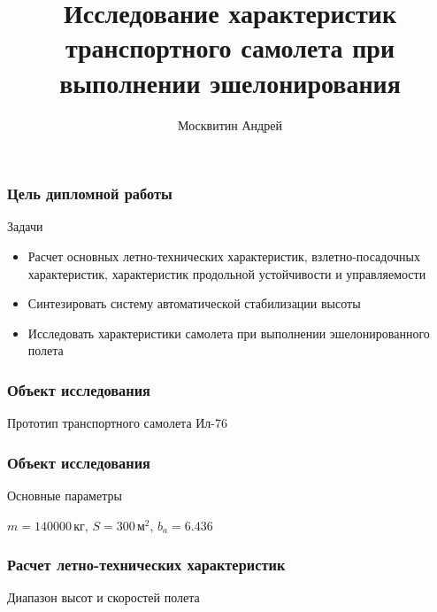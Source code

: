 \documentclass{beamer}
\title{Исследование характеристик транспортного самолета при выполнении эшелонирования}
\author{Москвитин Андрей}
\institute{М1О-403Б-18}
\date{}
\begin{document}
\maketitle

\begin{frame}
\frametitle{Цель дипломной работы}
\begin{block}{Задачи}
    \begin{itemize}
        \item Расчет основных летно-технических характеристик, взлетно-посадочных
            характеристик, характеристик продольной устойчивости и управляемости 
        \item Синтезировать систему автоматической стабилизации высоты 
        \item Исследовать характеристики самолета при выполнении эшелонированного полета 
    \end{itemize}
\end{block}
\end{frame}

\begin{frame}
\frametitle{Объект исследования}
Прототип транспортного самолета Ил-76
\begin{figure}
\end{figure}
\end{frame}

\begin{frame}
    \frametitle{Объект исследования}
    Основные параметры
    \vfill
    \begin{center}
    $m=140000\, кг$, $S=300\, м^2$, $b_a = 6.436$
    \end{center}
    \vfill
\end{frame}

\begin{frame}
    \frametitle{Расчет летно-технических характеристик}
    \begin{center}
   Диапазон высот и скоростей полета 
\resizebox{0.85\textwidth}{!}{
{}
}
\end{center}
\end{frame}
\end{document}
